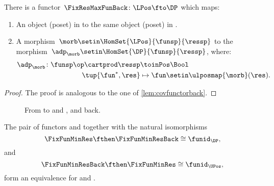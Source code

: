 \begin{lemma}
    \label{lem:cofunctorback}
    There is a functor~$\FixResMaxFunBack\colon \LPos \fto \DP$ which maps:
    \begin{enumerate}
        \item An object (poset) in \UPos to the same object (poset) in \DP.
        \item A morphism~$\morb\setin \HomSet{\LPos}{\funsp}{\ressp}$ to the morphism~$\adp_\morb \setin \HomSet{\DP}{\funsp}{\ressp}$, where:
              \begin{equation}
                  \begin{aligned}
                      \adp_\morb\colon \funsp\op \cartprod \ressp & \toinPos \Bool \\
                      \tup{\fun^*,\res}                           & \mapsto \fun \setin \ulposmap{\morb}(\res).
                  \end{aligned}
              \end{equation}
    \end{enumerate}
\end{lemma}

\begin{proof}
    The proof is analogous to the one of \cref{lem:covfunctorback}.
\end{proof}

\begin{figure}[tbh]
    \centering
    \caption{From \DP to \UPos and \LPos, and back.}
\end{figure}


\begin{lemma}
    The pair of functors \FixFunMinRes and \FixFunMinResBack together with the natural isomorphisms
    \begin{equation}
        \FixFunMinRes \fthen \FixFunMinResBack \cong \funid_\DP,
    \end{equation}
    and
    \begin{equation}
        \FixFunMinResBack \fthen \FixFunMinRes \cong \funid_\UPos,
    \end{equation}
    form an equivalence for \DP and \UPos.
\end{lemma}

